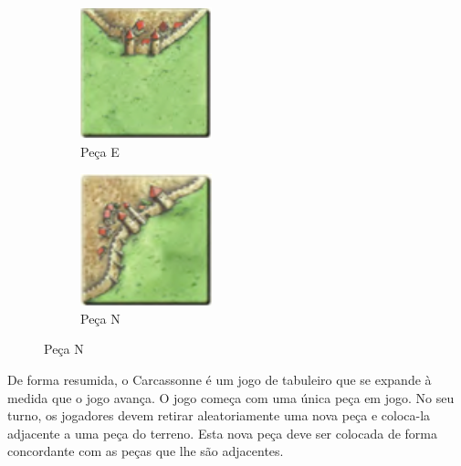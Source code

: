 \documentclass[11pt, a4paper, twoside]{article}
\begin{document}
\begin{figure}[h!]
\begin{subfigure}{.25\textwidth}
  \includegraphics[width=0.8\linewidth]{tileE}
  \caption{Peça E}
\end{subfigure}%
\begin{subfigure}{.25\textwidth}
  \centering
  \includegraphics[width=0.8\linewidth]{tileN}
  \caption{Peça N}
\end{subfigure}%
\end{figure}

De forma resumida, o Carcassonne é um jogo de tabuleiro que se expande à medida que o jogo avança. O jogo começa com uma única peça em jogo. No seu turno, os jogadores devem retirar aleatoriamente uma nova peça e coloca-la adjacente a uma peça do terreno. Esta nova peça deve ser colocada de forma concordante com as peças que lhe são adjacentes.
\end{document}
